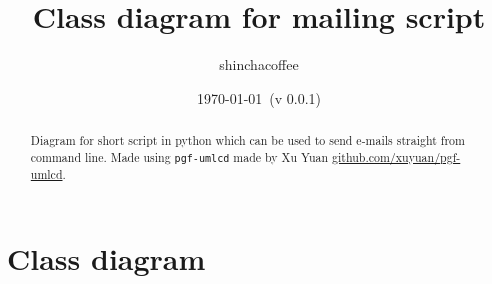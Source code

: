 \documentclass{article}
\begin{document}
	\title{Class diagram for mailing script}
	\author{shinchacoffee}
	\date{\today{}~(v 0.0.1)}
	\maketitle
	
	\begin{abstract}
		Diagram for short script in python which can be used to send e-mails straight from command line. Made using \texttt{pgf-umlcd} made by Xu Yuan \href{https://github.com/xuyuan/pgf-umlcd}{github.com/xuyuan/pgf-umlcd}.
	\end{abstract}
	
	
	\section{Class diagram}
	
\end{document}
